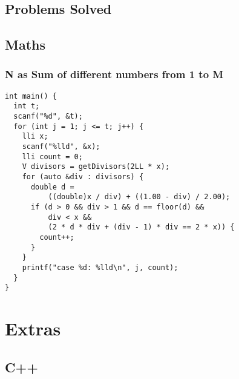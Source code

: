 \documentclass[twoside]{article}
\begin{document}
\begin{multicols*}{2}
\sectionfont{\bfseries\sffamily\centering\Huge}
\vspace{1em}
\section*{Problems Solved}
\vspace{3em}
\subsectionfont{\bfseries\sffamily\centering\LARGE}
\vspace{0em}
\subsection*{Maths}
\vspace{2em}
\subsubsectionfont{\large\bfseries\sffamily\underline}
\subsubsection*{N as Sum of different numbers from 1 to M}
\begin{verbatim}
int main() {
  int t;
  scanf("%d", &t);
  for (int j = 1; j <= t; j++) {
    lli x;
    scanf("%lld", &x);
    lli count = 0;
    V divisors = getDivisors(2LL * x);
    for (auto &div : divisors) {
      double d =
          ((double)x / div) + ((1.00 - div) / 2.00);
      if (d > 0 && div > 1 && d == floor(d) &&
          div < x &&
          (2 * d * div + (div - 1) * div == 2 * x)) {
        count++;
      }
    }
    printf("case %d: %lld\n", j, count);
  }
}
\end{verbatim}

\end{multicols*}
\sectionfont{\bfseries\sffamily\centering\Huge}
\vspace{1em}
\section*{Extras}
\vspace{3em}
\subsectionfont{\bfseries\sffamily\centering\LARGE}
\vspace{0em}
\subsection*{C++}
\vspace{2em}
\subsubsectionfont{\large\bfseries\sffamily\underline}
\end{document}
